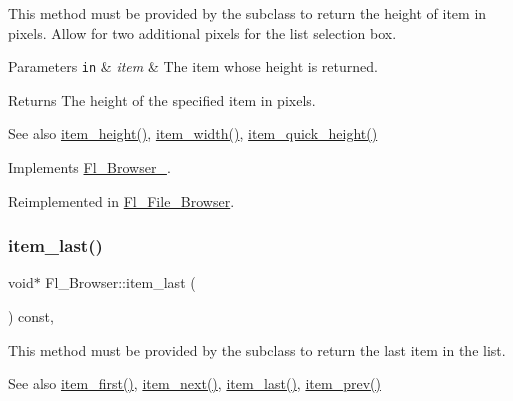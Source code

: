 This method must be provided by the subclass to return the height of {\ttfamily item} in pixels. Allow for two additional pixels for the list selection box. 
\begin{DoxyParams}[1]{Parameters}
\mbox{\tt in}  & {\em item} & The item whose height is returned. \\
\hline
\end{DoxyParams}
\begin{DoxyReturn}{Returns}
The height of the specified {\ttfamily item} in pixels. 
\end{DoxyReturn}
\begin{DoxySeeAlso}{See also}
\hyperlink{class_fl___browser_a57103fdfb68bbe7ebb8bbe133ebe9009}{item\+\_\+height()}, \hyperlink{class_fl___browser_acc938270d35aeb63341f2953a740d7f8}{item\+\_\+width()}, \hyperlink{class_fl___browser___aa9f378038994076e866daac8ca050507}{item\+\_\+quick\+\_\+height()} 
\end{DoxySeeAlso}


Implements \hyperlink{class_fl___browser___a5487d8f8d3e9cce3e87918f8f53e6ae6}{Fl\+\_\+\+Browser\+\_\+}.



Reimplemented in \hyperlink{class_fl___file___browser_adecceb89eda245a4d8fc03545f156107}{Fl\+\_\+\+File\+\_\+\+Browser}.

\mbox{\label{class_fl___browser_a5de7360f3e39ad20c3bf552893a92626}} 
\subsubsection{\texorpdfstring{item\+\_\+last()}{item\_last()}}
{\footnotesize\ttfamily void$\ast$ Fl\+\_\+\+Browser\+::item\+\_\+last (\begin{DoxyParamCaption}{ }\end{DoxyParamCaption}) const\hspace{0.3cm}{\ttfamily [protected]}, {\ttfamily [virtual]}}

This method must be provided by the subclass to return the last item in the list. \begin{DoxySeeAlso}{See also}
\hyperlink{class_fl___browser_a7822c6d04744af8f9ffa7a1e0c46955c}{item\+\_\+first()}, \hyperlink{class_fl___browser_aca0d9393c07552ce4ee75a9a10dbe93e}{item\+\_\+next()}, \hyperlink{class_fl___browser_a5de7360f3e39ad20c3bf552893a92626}{item\+\_\+last()}, \hyperlink{class_fl___browser_a0fbf4d057bc1b7afcdd872b78ee8526b}{item\+\_\+prev()} 
\end{DoxySeeAlso}


